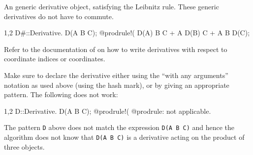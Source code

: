 
An generic derivative object, satisfying the Leibnitz rule. These
generic derivatives do not have to commute.
\begin{screen}{1,2}
D{#}::Derivative.
D(A B C);
@prodrule!(%
D(A) B C + A D(B) C + A B D(C);
\end{screen}
Refer to the documentation of  on how to
write derivatives with respect to coordinate indices or coordinates.

Make sure to declare the derivative either using the ``with any arguments''
notation as used above (using the hash mark), or by giving an
appropriate pattern. The following does not work:
\begin{screen}{1,2}
D::Derivative.
D(A B C);
@prodrule!(%
@prodrule: not applicable.
\end{screen}
The pattern \verb|D| above does not match the expression \verb|D(A B C)| 
and hence the algorithm does not know that \verb|D(A B C)| is a
derivative acting on the product of three objects.

